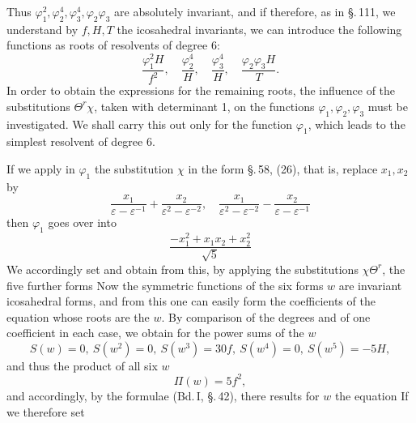 Thus $\varphi_1^2, \varphi_2^4, \varphi_3^4, \varphi_2\varphi_3$ are absolutely invariant, and if therefore, as in \S.\,111, we understand by $f, H, T$ the icosahedral invariants, we can introduce the following functions as roots of resolvents of degree $6$:
\[
\frac{\varphi_1^2H}{f^2},\quad \frac{\varphi_2^4}{H},\quad \frac{\varphi_3^4}{H},\quad \frac{\varphi_2\varphi_3H}{T}.
\]
In order to obtain the expressions for the remaining roots, the influence of the substitutions $\Theta^r\chi$, taken with determinant 1, on the functions $\varphi_1, \varphi_2, \varphi_3$ must be investigated. We shall carry this out only for the function $\varphi_1$, which leads to the simplest resolvent of degree $6$.

If we apply in $\varphi_1$ the substitution $\chi$ in the form \S.\,58, (26), that is, replace $x_1, x_2$ by
\[
\frac{x_1}{\varepsilon-\varepsilon^{-1}}+\frac{x_2}{\varepsilon^2-\varepsilon^{-2}},\quad \frac{x_1}{\varepsilon^2-\varepsilon^{-2}}-\frac{x_2}{\varepsilon-\varepsilon^{-1}}
\]
then $\varphi_1$ goes over into
\[
\frac{-x_1^2+x_1x_2+x_2^2}{\sqrt5}
\]
We accordingly set
and obtain from this, by applying the substitutions $\chi\Theta^r$, the five further forms
Now the symmetric functions of the six forms $w$ are invariant icosahedral forms, and from this one can easily form the coefficients of the equation whose roots are the $w$. By comparison of the degrees and of one coefficient in each case, we obtain for the power sums of the $w$
\[
S(w)=0,\ S(w^2)=0,\ S(w^3)=30f,\ S(w^4)=0,\ S(w^5)=-5H,
\]
and thus the product of all six $w$
\[
\Pi(w)=5f^2,
\]
and accordingly, by the  formulae (Bd.\,I, \S.\,42), there results for $w$ the equation
If we therefore set
